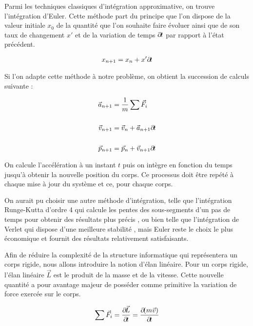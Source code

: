 Parmi les techniques classiques d'intégration approximative, on trouve
l'intégration d'Euler. Cette méthode part du principe que l'on dispose
de la valeur initiale $x_0$ de la quantité que l'on souhaite faire
évoluer ainsi que de son taux de changement $x'$ et de la variation de
temps $\partial \! t$ par rapport à l'état précédent.

\begin{align*}
  x_{n+1} = x_{n} + x' \partial \! t \\
\end{align*}

Si l'on adapte cette méthode à notre problème, on obtient la
succession de calculs suivante :

\begin{align*}
  \vec{a}_{n+1} &= \frac{1}{m} \sum \vec{F}_i \\ \\
  \vec{v}_{n+1} &= \vec{v}_n + \vec{a}_{n+1} \partial \! t \\ \\
  \vec{p}_{n+1} &= \vec{p}_n + \vec{v}_{n+1} \partial \! t \\
\end{align*}

On calcule l'accélération à un instant $t$ puis on intègre en fonction
du temps jusqu'à obtenir la nouvelle position du corps. Ce processus
doit être repété à chaque mise à jour du système et ce, pour chaque
corps.

On aurait pu choisir une autre méthode d'intégration, telle que
l'intégration Runge-Kutta d'ordre 4 qui calcule les pentes des
sous-segments d'un pas de temps pour obtenir des résultats plus précis
\cite{fiedler}, ou bien telle que l'intégration de Verlet qui dispose
d'une meilleure stabilité \cite{bitterli}, mais Euler reste le choix
le plus économique et fournit des résultats relativement
satisfaisants.

Afin de réduire la complexité de la structure informatique qui
représentera un corps rigide, nous allons introduire la notion d'élan
linéaire. Pour un corps rigide, l'élan linéaire $\vec{L}$ est le
produit de la masse et de la vitesse. Cette nouvelle quantité a pour
avantage majeur de posséder comme primitive la variation de force
exercée sur le corps.

\begin{align*}
  {\sum \vec{F}_i} = \frac{\partial \! \vec{L}}{\partial \! t} = \frac{\partial \! (m\vec{v})}{\partial \! t} \\
\end{align*}

